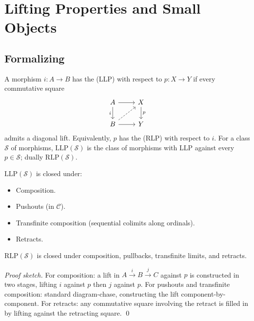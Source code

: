 \section{Lifting Properties and Small Objects}
\label{sec:lifting-small-objects}

\subsection{Formalizing}

\begin{definition}
\label{def:llp-rlp}
A morphism $i : A \to B$ has the  (LLP) with
respect to $p : X \to Y$ if every commutative square
\begin{equation*}
  \begin{tikzcd}
    A \arrow[r] \arrow[d, "i"'] & X \arrow[d, "p"] \\
    B \arrow[r] \arrow[ur, dashed] & Y
  \end{tikzcd}
\end{equation*}
admits a diagonal lift. Equivalently, $p$ has the  (RLP) with respect to $i$. For a class $\mathcal{S}$ of
morphisms, $\mathrm{LLP}(\mathcal{S})$ is the class of morphisms with
LLP against every $p \in \mathcal{S}$; dually $\mathrm{RLP}(\mathcal{S})$.
\end{definition}

\begin{lemma}
\label{lem:llp-closure}
$\mathrm{LLP}(\mathcal{S})$ is closed under:
\begin{itemize}
  \item Composition.
  \item Pushouts (in $\mathcal{C}$).
  \item Transfinite composition (sequential colimits along ordinals).
  \item Retracts.
\end{itemize}
$\mathrm{RLP}(\mathcal{S})$ is closed under composition, pullbacks, transfinite limits, and retracts.
\end{lemma}

\begin{proof}[Proof sketch]
For composition: a lift in $A \xrightarrow{i} B \xrightarrow{j} C$ against
$p$ is constructed in two stages, lifting $i$ against $p$ then $j$ against
$p$. For pushouts and transfinite composition: standard diagram-chase,
constructing the lift component-by-component. For retracts: any commutative
square involving the retract is filled in by lifting against the
retracting square. \qed
\end{proof}

